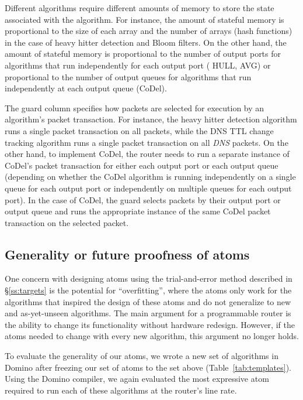 Different algorithms require different amounts of memory to store the state
associated with the algorithm. For instance, the amount of stateful memory is
proportional to the size of each array and the number of arrays (hash
functions) in the case of heavy hitter detection and Bloom filters. On the
other hand, the amount of stateful memory is proportional to the number of
output ports for algorithms that run independently for each output port (\eg
HULL, AVG) or proportional to the number of output queues for algorithms that
run independently at each output queue (\eg CoDel).

The guard column specifies how packets are selected for execution by an
algorithm's packet transaction. For instance, the heavy hitter detection
algorithm runs a single packet transaction on all packets, while the DNS TTL
change tracking algorithm runs a single packet transaction on all {\em DNS}
packets. On the other hand, to implement CoDel, the router needs to run a
separate instance of CoDel's packet transaction for either each output port or
each output queue (depending on whether the CoDel algorithm is running
independently on a single queue for each output port or independently on
multiple queues for each output port). In the case of CoDel, the guard selects
packets by their output port or output queue and runs the appropriate instance
of the same CoDel packet transaction on the selected packet.

\subsection{Generality or future proofness of atoms}

One concern with designing atoms using the trial-and-error method described in
\S\ref{ss:targets} is the potential for ``overfitting'', where the atoms only
work for the algorithms that inspired the design of these atoms and do not
generalize to new and as-yet-unseen algorithms. The main argument for a
programmable router is the ability to change its functionality without hardware
redesign. However, if the atoms needed to change with every new algorithm, this
argument no longer holds.

To evaluate the generality of our atoms, we wrote a new set of algorithms in
Domino after freezing our set of atoms to the set above
(Table~\ref{tab:templates}). Using the Domino compiler, we again evaluated the
most expressive atom required to run each of these algorithms at the router's
line rate.

